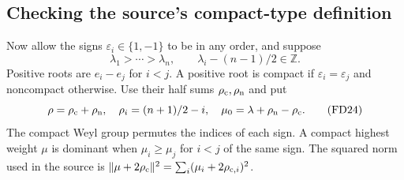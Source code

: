 \subsection{Checking the source's compact-type definition}

Now allow the signs $\varepsilon_i\in\{1,-1\}$ to be in
any order, and suppose
\[
             \lambda_1>\cdots>\lambda_n,\qquad
             \lambda_i-(n-1)/2\in\mathbb Z.
 \tag{FD23}
\]
Positive roots are $e_i-e_j$ for $i<j$. A positive root
is compact if $\varepsilon_i=\varepsilon_j$ and
noncompact otherwise. Use their half sums
$\rho_{\rm c},\rho_{\rm n}$ and put
\[
 \rho=\rho_{\rm c}+\rho_{\rm n},\quad
 \rho_i=(n+1)/2-i,\quad
 \mu_0=\lambda+\rho_{\rm n}-\rho_{\rm c}.
 \tag{FD24}
\]
The compact Weyl group permutes the indices of each sign.
A compact highest weight $\mu$ is dominant when
$\mu_i\ge\mu_j$ for $i<j$ of the same sign.
The squared norm used in the source is
$\|\mu+2\rho_{\rm c}\|^2=\sum_i(\mu_i+2\rho_{{\rm c},i})^2$.

